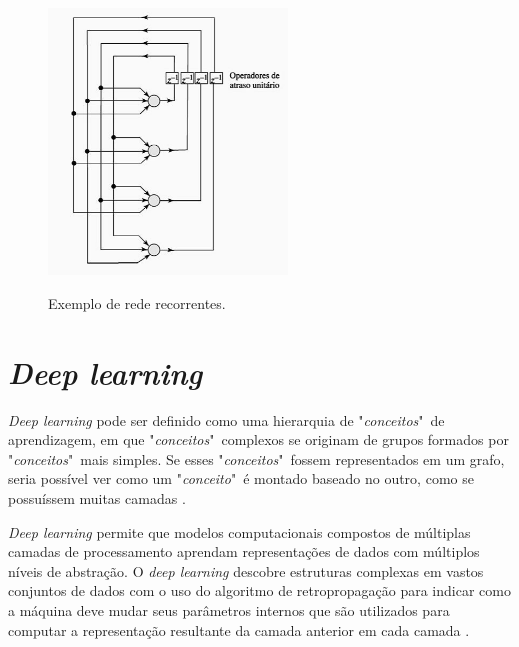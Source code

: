 \begin{itemize}
\begin{figure}[H]
  \centering
  \caption{Exemplo de rede recorrentes.}
  \includegraphics[width=180pt]{dados/figuras/retroalimentacao}
  \label{fig:retroalimentacao}
\end{figure}
\end{itemize}
\section{\textit{Deep learning}}
\label{chap:deeplearning}
\textit{Deep learning} pode ser definido como uma hierarquia de "\textit{conceitos}"\  de aprendizagem, em que "\textit{conceitos}"\  complexos se originam de grupos formados por "\textit{conceitos}"\  mais simples. Se esses "\textit{conceitos}"\  fossem representados em um grafo, seria possível ver como um "\textit{conceito}"\  é montado baseado no outro, como se possuíssem muitas camadas \cite{Goodfellow-et-al-2016}.

\begin{citacao}
    \textit{Deep learning} permite que modelos computacionais compostos de múltiplas camadas de processamento aprendam representações de dados com múltiplos níveis de abstração.
   O  \textit{deep learning} descobre estruturas complexas em vastos conjuntos de dados com o uso do algoritmo de retropropagação para indicar como a máquina deve mudar seus parâmetros internos que são utilizados para computar a representação resultante da camada anterior em cada camada \cite{lecun2015deep}.
\end{citacao}

